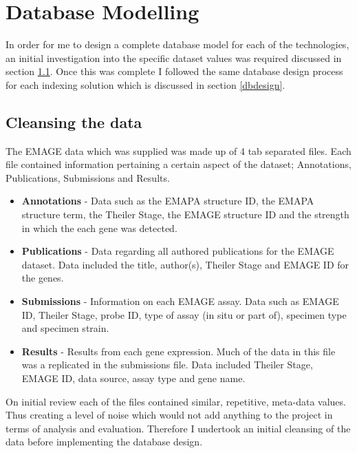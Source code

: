 \chapter{Database Modelling}\label{design}

In order for me to design a complete database model for each of the technologies, an initial investigation into the specific dataset values was required discussed in section \ref{datasetvalues}. Once this was complete I followed the same database design process for each indexing solution which is discussed in section \ref{dbdesign}.

\section{Cleansing the data}\label{datasetvalues}

The EMAGE data which was supplied was made up of 4 tab separated files. Each file contained information pertaining a certain aspect of the dataset; Annotations, Publications, Submissions and Results.

\begin{itemize}
\item \textbf{Annotations} - Data such as the EMAPA structure ID, the EMAPA structure term, the Theiler Stage, the EMAGE structure ID and the strength in which the each gene was detected.

\item \textbf{Publications} - Data regarding all authored publications for the EMAGE dataset. Data included the title, author(s), Theiler Stage and EMAGE ID for the genes.

\item \textbf{Submissions} - Information on each EMAGE assay. Data such as EMAGE ID, Theiler Stage, probe ID, type of assay (in situ or part of), specimen type and specimen strain.

\item \textbf{Results} - Results from each gene expression. Much of the data in this file was a replicated in the submissions file. Data included Theiler Stage, EMAGE ID, data source, assay type and gene name.
\end{itemize}

On initial review each of the files contained similar, repetitive, meta-data values. Thus creating a level of noise which would not add anything to the project in terms of analysis and evaluation. Therefore I undertook an initial cleansing of the data before implementing the database design.


